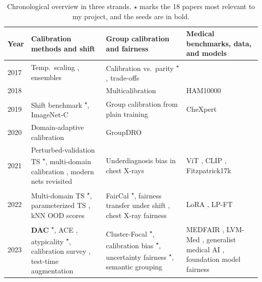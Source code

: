 \documentclass[sigconf,nonacm]{acmart}
\newcommand{\core}{\textsuperscript{$\star$}}
\begin{document}
\begin{table}[t]
  \caption{Chronological overview in three strands. $\star$ marks the 18 papers most relevant to my project, and the seeds are in bold.}
  \label{tab:chronology}
  \scriptsize
  \setlength{\tabcolsep}{4pt}
  \renewcommand{\arraystretch}{1.0}
  \begin{tabularx}{\textwidth}{@{}l>{\raggedright\arraybackslash}X>{\raggedright\arraybackslash}X>{\raggedright\arraybackslash}X@{}}
    \toprule
    \textbf{Year} & \textbf{Calibration methods and shift} & \textbf{Group calibration and fairness} & \textbf{Medical benchmarks, data, and models} \\
    \midrule
    2017 & Temp.\ scaling \cite{guo2017calibration}, ensembles \cite{lakshminarayanan2017ensembles} & Calibration vs.\ parity \cite{pleiss2017fairness}\core, trade-offs \cite{kleinberg2017inherent} & \\
    2018 & & Multicalibration \cite{hebertjohnson2018multicalibration} & HAM10000 \cite{tschandl2018ham10000} \\
    2019 & Shift benchmark \cite{ovadia2019trust}\core, ImageNet-C \cite{hendrycks2019benchmarking} & Group calibration from plain training \cite{liu2019implicit} & CheXpert \cite{irvin2019chexpert} \\
    2020 & Domain-adaptive calibration \cite{wang2020transferable} & GroupDRO \cite{sagawa2020groupdro} & \\
    2021 & Perturbed-validation TS \cite{tomani2021posthoc}\core, multi-domain calibration \cite{gong2021confidence}, modern nets revisited \cite{minderer2021revisiting} & Underdiagnosis bias in chest X-rays \cite{seyyedkalantari2021underdiagnosis} & ViT \cite{dosovitskiy2021vit}, CLIP \cite{radford2021clip}, Fitzpatrick17k \cite{groh2021fitzpatrick} \\
    2022 & Multi-domain TS \cite{yu2022multidomain}\core, parameterized TS \cite{tomani2022pts}, kNN OOD scores \cite{sun2022knn} & FairCal \cite{salvador2022faircal}\core, fairness transfer under shift \cite{schrouff2022diagnosing}, chest X-ray fairness \cite{zhang2022improving} & LoRA \cite{hu2022lora}, LP-FT \cite{kumar2022finetuning} \\
    2023 & \textbf{DAC} \cite{tomani2023dac}\core, ACE \cite{zou2023ace}, atypicality \cite{yuksekgonul2023atypicality}\core, calibration survey \cite{wang2023survey}, test-time augmentation \cite{hekler2023tta} & Cluster-Focal \cite{shui2023clusterfocal}\core, calibration bias \cite{riccilara2023calibration}\core, uncertainty fairness \cite{mehta2023evaluating}\core, semantic grouping \cite{yang2023beyond} & MEDFAIR \cite{zong2023medfair}, LVM-Med \cite{nguyen2023lvmmed}, generalist medical AI \cite{moor2023generalist}, foundation model fairness \cite{khan2023fair} \\

\end{tabularx}
\end{table}
\end{document}
